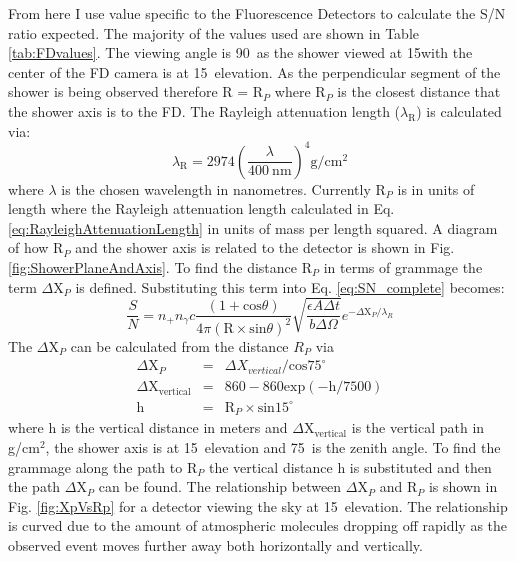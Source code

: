 From here I use value specific to the Fluorescence Detectors to calculate the S/N ratio expected. The majority of the values used are shown in Table \ref{tab:FDvalues}. The viewing angle is 90\textdegree \ as the shower viewed at 15\textdegree with the center of the FD camera is at 15\textdegree \ elevation. As the perpendicular segment of the shower is being observed therefore R = R$_P$ where R$_P$ is the closest distance that the shower axis is to the FD. The Rayleigh attenuation length ($\lambda_{\mathrm{R}}$) is calculated via:
\begin{equation}
\lambda_{\mathrm{R}} = 2974 \left(\frac{\lambda}{400 \ \mathrm{nm}} \right)^4 \mathrm{g}/\mathrm{cm}^2 \label{eq:RayleighAttenuationLength}
\end{equation}
where $\lambda$ is the chosen wavelength in nanometres. Currently R$_P$ is in units of length where the Rayleigh attenuation length calculated in Eq. \ref{eq:RayleighAttenuationLength} in units of mass per length squared. A diagram of how R$_P$ and the shower axis is related to the detector is shown in Fig. \ref{fig:ShowerPlaneAndAxis}. To find the distance R$_P$ in terms of grammage the term $\Delta$X$_P$ is defined. Substituting this term into Eq. \ref{eq:SN_complete} becomes:
\begin{equation}
\frac{S}{N} = n_+ n_{\gamma} c \frac{(1 + \mathrm{cos}\theta)}{4 \pi (\mathrm{R} \times \mathrm{sin}\theta)^2} \sqrt{\frac{\epsilon A \Delta t}{b \Delta\Omega}} e^{-\Delta \mathrm{X}_P / \lambda_R}
\end{equation}
The $\Delta$X$_P$ can be calculated from the distance $R_P$ via
\begin{eqnarray}
\Delta \mathrm{X}_P &=& \Delta X_{vertical} / \mathrm{cos}75^{\circ} \\
\Delta \mathrm{X}_{\mathrm{vertical}} &=& 860 - 860\mathrm{exp}(-\mathrm{h}/7500) \\
\mathrm{h} &=& \mathrm{R}_P \times \mathrm{sin}15^{\circ}
\end{eqnarray}
where h is the vertical distance in meters and $\Delta$X$_{\mathrm{vertical}}$ is the vertical path in g/cm$^2$, the shower axis is at 15\textdegree \ elevation and 75\textdegree \ is the zenith angle. To find the grammage along the path to R$_P$ the vertical distance h is substituted and then the path $\Delta$X$_P$ can be found. The relationship between $\Delta$X$_P$ and R$_P$ is shown in Fig. \ref{fig:XpVsRp} for a detector viewing the sky at 15\textdegree \ elevation. The relationship is curved due to the amount of atmospheric molecules dropping off rapidly as the observed event moves further away both horizontally and vertically.


